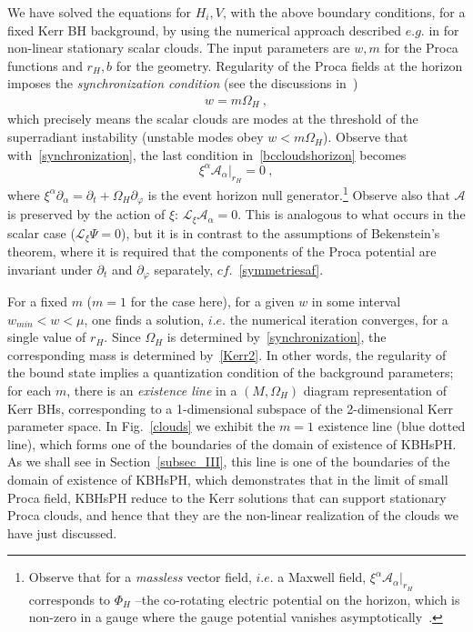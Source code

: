  
We have solved the equations for $H_i,V$, with the above boundary  conditions, for
a fixed Kerr BH background, by using the numerical approach described $e.g.$ in \cite{Herdeiro:2014pka}
for non-linear stationary scalar clouds.
The input parameters are $w,m$ for the Proca functions and $r_H,b$ for the geometry.
Regularity of the Proca fields at the horizon imposes the \textit{synchronization condition} (see the discussions in~\cite{Benone:2014ssa,Brihaye:2014nba})
 \begin{eqnarray}
w=m\Omega_H~,
\label{synchronization} 
\end{eqnarray}
which precisely means the scalar clouds are modes at the threshold of the superradiant instability (unstable modes obey $w<m\Omega_H$).  Observe that with~\eqref{synchronization}, the last condition in~\eqref{bccloudshorizon} becomes
\begin{equation}
\label{condA}
\xi^\alpha \mathcal{A}_\alpha\big|_{r_H}=0 \ ,
\end{equation}
%
where $\xi^\alpha\partial_\alpha=\partial_t+\Omega_H\partial_\varphi$ is the event horizon null generator.\footnote{Observe that for a \textit{massless} vector field, $i.e.$ a Maxwell field, $\xi^\alpha \mathcal{A}_\alpha\big|_{r_H}$ corresponds 
to $\Phi_H$ --the co-rotating electric potential on the horizon, which is non-zero in a gauge where the gauge potential vanishes asymptotically~\cite{Townsend:1997ku}.}
Observe also that  $\mathcal{A}$ is preserved by the action of $\xi$: $\mathcal{L}_\xi\mathcal{A}_\alpha=0$. 
This is analogous to what occurs in the scalar case ($\mathcal{L}_\xi\Psi=0$), but it is in contrast to the assumptions of Bekenstein's theorem, where it is required that the components of the Proca potential are invariant under $\partial_t$ and $\partial_\varphi$ separately, $cf.$~\eqref{symmetriesaf}.


For a fixed $m$ ($m=1$ for the case here), for a given $w$ in some interval $w_{min}<w<\mu$, one finds a solution,  $i.e.$ the numerical iteration converges,  for a single value of $r_H$. Since $\Omega_H$ is determined by~\eqref{synchronization}, the corresponding mass is determined by~\eqref{Kerr2}. In other words, the regularity of the bound state implies a quantization condition of the background parameters; for each $m$, there is an \textit{existence line} in a $(M,\Omega_H)$ diagram representation of Kerr BHs, corresponding to a 1-dimensional subspace of the 2-dimensional Kerr parameter space. In Fig.~\ref{clouds} we exhibit the $m=1$ existence line (blue dotted line), which forms one of the boundaries of the domain of existence of KBHsPH. As we shall see in Section~\ref{subsec_III}, this line is one of the boundaries of the domain of existence of KBHsPH, which demonstrates that in the limit of small Proca field, KBHsPH reduce to the Kerr solutions that can support stationary Proca clouds, and hence that they are the non-linear realization of the clouds we have just discussed. 

